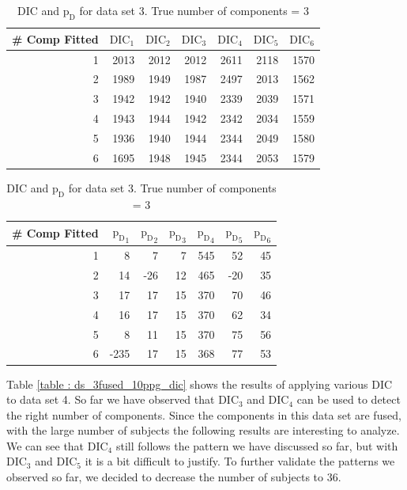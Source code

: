 \begin{table}[!htb]
\centering
\caption{DIC and $\text{p}_\text{D}$ for data set 3. True number of components = 3}
\label{table : ds_3wellsep_3ppg_dic}
\begin{tabular}{@{}rrrrrrr@{}}
\toprule
\# Comp Fitted & $\text{DIC}_1$ & $\text{DIC}_2$  & $\text{DIC}_3$  & $\text{DIC}_4$  & $\text{DIC}_5$  & $\text{DIC}_6$  \\ \midrule
1 & 2013 & 2012 & 2012 & 2611 & 2118 & 1570 \\
2 & 1989 & 1949 & 1987 & 2497 & 2013 & 1562 \\
3 & 1942 & 1942 & 1940 & 2339 & 2039 & 1571 \\
4 & 1943 & 1944 & 1942 & 2342 & 2034 & 1559 \\
5 & 1936 & 1940 & 1944 & 2344 & 2049 & 1580 \\
6 & 1695 & 1948 & 1945 & 2344 & 2053 & 1579 \\ \bottomrule
\end{tabular}

\begin{tabular}{@{}rrrrrrr@{}}
\toprule
\# Comp Fitted & ${\text{p}_\text{D}}_1$ & ${\text{p}_\text{D}}_2$ & ${\text{p}_\text{D}}_3$ & ${\text{p}_\text{D}}_4$ & ${\text{p}_\text{D}}_5$ & ${\text{p}_\text{D}}_6$ \\ \midrule
1 & 8 & 7 & 7 & 545 & 52 & 45 \\
2 & 14 & -26 & 12 & 465 & -20 & 35 \\
3 & 17 & 17 & 15 & 370 & 70 & 46 \\
4 & 16 & 17 & 15 & 370 & 62 & 34 \\
5 & 8 & 11 & 15 & 370 & 75 & 56 \\
6 & -235 & 17 & 15 & 368 & 77 & 53 \\ \bottomrule
\end{tabular}
\end{table}

Table \ref{table : ds_3fused_10ppg_dic} shows the results of applying various DIC to data set 4. So far we have observed that $\text{DIC}_3$ and $\text{DIC}_4$ can be used to detect the right number of components. Since the components in this data set are fused, with the large number of subjects the following results are interesting to analyze. We can see that $\text{DIC}_4$ still follows the pattern we have discussed so far, but with $\text{DIC}_3$ and $\text{DIC}_5$ it is a bit difficult to justify. To further validate the patterns we observed so far, we decided to decrease the number of subjects to 36.\\
 
